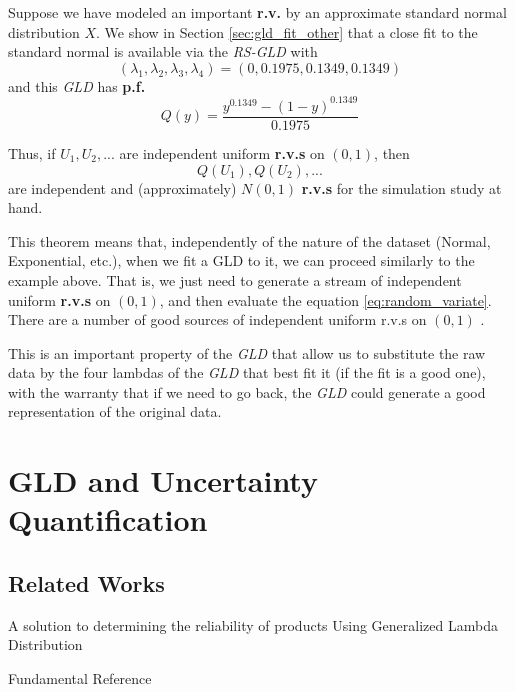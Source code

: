 \begin{exmp}
Suppose we have modeled an important \textbf{r.v.} by an approximate standard normal distribution $X$. We show in Section \ref{sec:gld_fit_other} that a close fit to the standard normal is available via the \textit{RS-GLD} with 
\begin{equation}
(\lambda_{1}, \lambda_{2}, \lambda_{3}, \lambda_{4}) = (0, 0.1975, 0.1349, 0.1349)
\end{equation}
and this \textit{GLD} has \textbf{p.f.} 
\begin{equation}
Q(y) = \frac{y^{0.1349}-(1-y)^{0.1349}}{0.1975}
\end{equation}
\end{exmp}

Thus, if $U_{1}, U_{2},...$ are independent uniform \textbf{r.v.s} on $(0, 1)$, then 
\begin{equation}\label{eq:random_variate}
Q(U_{1}), Q(U_{2}),...
\end{equation}
are independent and (approximately) $N(0, 1)$ \textbf{r.v.s} for the simulation study at hand.

This theorem means that, independently of the nature of the dataset (Normal, Exponential, etc.), when we fit a GLD to it, we can proceed similarly to the example above. That is, we just need to generate a stream of independent uniform \textbf{r.v.s} on $(0, 1)$, and then evaluate the equation \ref{eq:random_variate}. There are a number of good sources of independent uniform r.v.s on $(0, 1)$ \cite{Karian2011}. 

This is an important property of the \textit{GLD} that allow us to substitute the raw data by the four lambdas of the \textit{GLD} that best fit it (if the fit is a good one), with the warranty that if we need to go back, the \textit{GLD} could generate a good representation of the original data.


\section{GLD and Uncertainty Quantification}
\subsection{Related Works}
A solution to determining the reliability of products Using Generalized Lambda Distribution \cite{Movahedi2013}

Fundamental Reference \cite{Lampasi2006}

